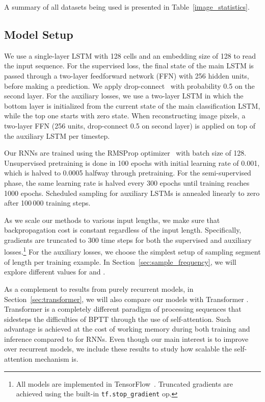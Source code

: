 \documentclass{article}
\begin{document}
A summary of all datasets being used is presented in Table~\ref{image_statistics}.

\subsection{Model Setup}
We use a single-layer LSTM with 128 cells and an embedding size of 128 to read the input sequence. 
For the supervised loss, the final state of the main LSTM is passed through a two-layer feedforward network (FFN) with 256 hidden units, before making a prediction. We apply drop-connect~\cite{wan2013regularization} with probability 0.5 on the second layer. For the auxiliary losses, we use a two-layer LSTM in which the bottom layer is initialized from the current state of the main classification LSTM, while the top one starts with zero state. When reconstructing image pixels, a two-layer FFN (256 units, drop-connect 0.5 on second layer) is applied on top of the auxiliary LSTM per timestep.

Our RNNs are trained using the RMSProp optimizer~\cite{Tieleman2012} with batch size of 128. Unsupervised pretraining is done in 100 epochs with initial learning rate of 0.001, which is halved to 0.0005 halfway through pretraining. For the semi-supervised phase, the same learning rate is halved every 300 epochs until training reaches 1000 epochs. Scheduled sampling for auxiliary LSTMs is annealed linearly to zero after 100\,000 training steps.

As we scale our methods to various input lengths, we make sure that backpropagation cost is constant regardless of the input length. Specifically, gradients are truncated to 300 time steps for both the supervised and auxiliary losses.\footnote{All models are implemented in TensorFlow~\cite{tensorflow2015-whitepaper}. Truncated gradients are achieved using the built-in \texttt{tf.stop\_gradient} op.}
For the auxiliary losses, we choose the simplest setup of sampling  segment of length  per training example. In Section~\ref{sec:sample_frequency}, we will explore different values for  and .



As a complement to results from purely recurrent models, in Section~\ref{sec:transformer}, we will also compare our models with Transformer \cite{vaswani2017attention}. Transformer is a completely different paradigm of processing sequences that sidesteps the difficulties of BPTT through the use of self-attention. Such advantage is achieved at the cost of  working memory during both training and inference compared to  for RNNs. Even though our main interest is to improve over recurrent models, we include these results to study how scalable the self-attention mechanism is. 
\end{document}

